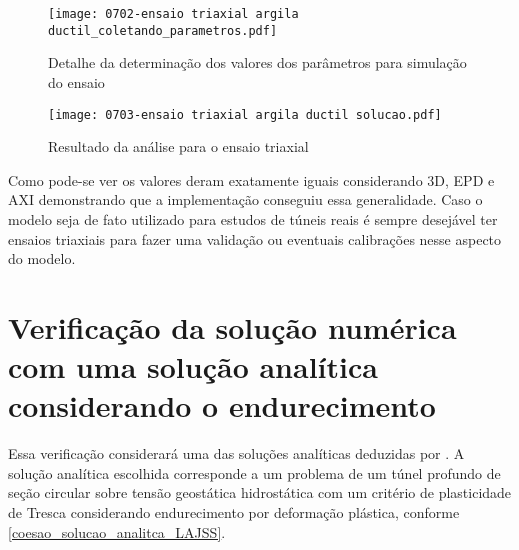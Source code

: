 \begin{figure}[H]
 	\begin{center}
 		\texttt{[image: 0702-ensaio triaxial argila ductil\_coletando\_parametros.pdf]}
 	\end{center}
 	\caption{\label{ensaio_triaxial_parametros}Detalhe da determinação dos valores dos parâmetros para simulação do ensaio}
\end{figure}

\begin{figure}[H]
	\begin{center}
		\texttt{[image: 0703-ensaio triaxial argila ductil solucao.pdf]}
	\end{center}
	\caption{\label{ensaio_triaxial_solucao}Resultado da análise para o ensaio triaxial}
\end{figure}

Como pode-se ver os valores deram exatamente iguais considerando 3D, EPD e AXI demonstrando que a implementação conseguiu essa generalidade. Caso o modelo seja de fato utilizado para estudos de túneis reais é sempre desejável ter ensaios triaxiais para fazer uma validação ou eventuais calibrações nesse aspecto do modelo.

\section{Verificação da solução numérica com uma solução analítica considerando o endurecimento}

Essa verificação considerará uma das soluções analíticas deduzidas por . A solução analítica escolhida corresponde a um problema de um túnel profundo de seção circular sobre tensão geostática hidrostática com um critério de plasticidade de Tresca considerando endurecimento por deformação plástica, conforme \autoref{coesao_solucao_analitca_LAJSS}. 

